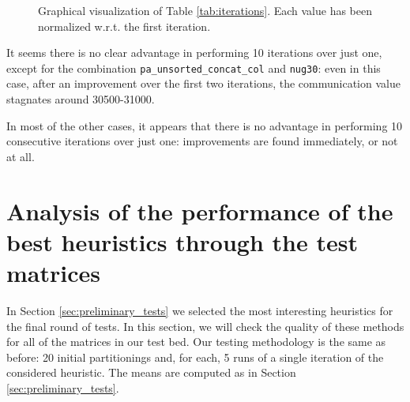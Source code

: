 \begin{figure}[h]
	\centering
	\caption{Graphical visualization of Table \ref{tab:iterations}. Each value has been normalized w.r.t. the first iteration. } \label{fig:iterations}
\end{figure}

It seems there is no clear advantage in performing 10 iterations over just one, except for the combination \verb|pa_unsorted_concat_col| and \verb|nug30|: even in this case, after an improvement over the first two iterations, the communication value stagnates around 30500-31000.

In most of the other cases, it appears that there is no advantage in performing 10 consecutive iterations over just one: improvements are found immediately, or not at all.

\section{Analysis of the performance of the best heuristics through the test matrices} \label{sec:final_tests}

In Section \ref{sec:preliminary_tests} we selected the most interesting heuristics for the final round of tests. In this section, we will check the quality of these methods for all of the matrices in our test bed. Our testing methodology is the same as before: 20 initial partitionings and, for each, 5 runs of a single iteration of the considered heuristic. The means are computed as in Section \ref{sec:preliminary_tests}.

